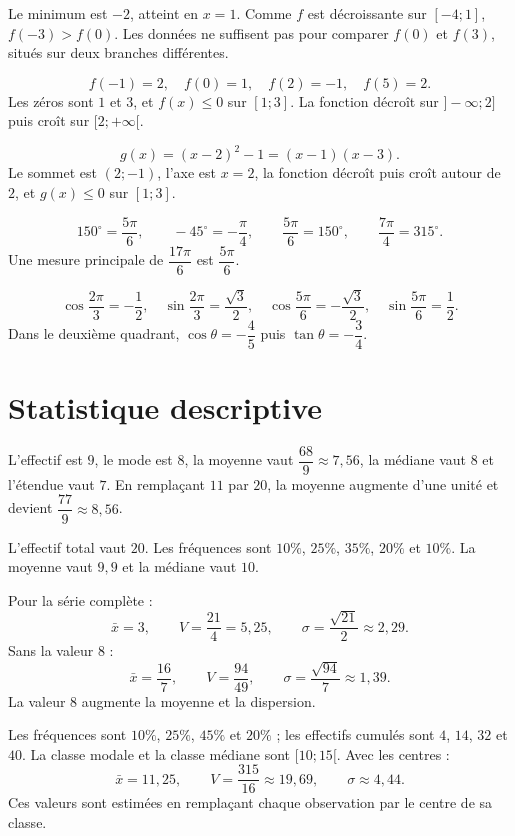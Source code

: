 Le minimum est $-2$, atteint en $x=1$. Comme $f$ est décroissante sur
$[-4;1]$, $f(-3)>f(0)$. Les données ne suffisent pas pour comparer
$f(0)$ et $f(3)$, situés sur deux branches différentes.

\[
f(-1)=2,\quad f(0)=1,\quad f(2)=-1,\quad f(5)=2.
\]
Les zéros sont $1$ et $3$, et $f(x)\leq0$ sur $[1;3]$. La fonction décroît
sur $]-\infty;2]$ puis croît sur $[2;+\infty[$.

\[
g(x)=(x-2)^2-1=(x-1)(x-3).
\]
Le sommet est $(2;-1)$, l'axe est $x=2$, la fonction décroît puis croît autour
de $2$, et $g(x)\leq0$ sur $[1;3]$.

\[
150^\circ=\frac{5\pi}{6},\qquad -45^\circ=-\frac{\pi}{4},
\qquad \frac{5\pi}{6}=150^\circ,\qquad \frac{7\pi}{4}=315^\circ.
\]
Une mesure principale de $\dfrac{17\pi}{6}$ est $\dfrac{5\pi}{6}$.

\[
\cos\frac{2\pi}{3}=-\frac12,\quad
\sin\frac{2\pi}{3}=\frac{\sqrt3}{2},\quad
\cos\frac{5\pi}{6}=-\frac{\sqrt3}{2},\quad
\sin\frac{5\pi}{6}=\frac12.
\]
Dans le deuxième quadrant, $\cos\theta=-\dfrac45$ puis
$\tan\theta=-\dfrac34$.

\section*{Statistique descriptive}

L'effectif est $9$, le mode est $8$, la moyenne vaut $\dfrac{68}{9}\approx
7{,}56$, la médiane vaut $8$ et l'étendue vaut $7$. En remplaçant $11$ par
$20$, la moyenne augmente d'une unité et devient $\dfrac{77}{9}\approx8{,}56$.

L'effectif total vaut $20$. Les fréquences sont $10\%$, $25\%$, $35\%$,
$20\%$ et $10\%$. La moyenne vaut $9{,}9$ et la médiane vaut $10$.

Pour la série complète :
\[
\bar x=3,\qquad V=\frac{21}{4}=5{,}25,\qquad
\sigma=\frac{\sqrt{21}}2\approx2{,}29.
\]
Sans la valeur $8$ :
\[
\bar x=\frac{16}{7},\qquad V=\frac{94}{49},\qquad
\sigma=\frac{\sqrt{94}}7\approx1{,}39.
\]
La valeur $8$ augmente la moyenne et la dispersion.

Les fréquences sont $10\%$, $25\%$, $45\%$ et $20\%$ ; les effectifs cumulés
sont $4$, $14$, $32$ et $40$. La classe modale et la classe médiane sont
$[10;15[$. Avec les centres :
\[
\bar x=11{,}25,\qquad V=\frac{315}{16}\approx19{,}69,\qquad
\sigma\approx4{,}44.
\]
Ces valeurs sont estimées en remplaçant chaque observation par le centre de sa
classe.

